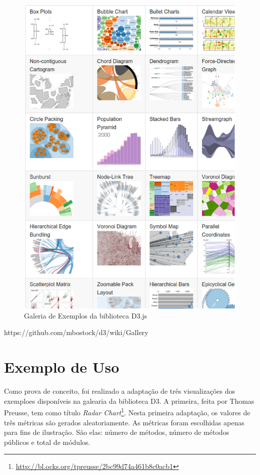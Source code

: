 \begin{figure}[!htb]
	\centering
    \includegraphics[keepaspectratio=true,scale=0.5]
    {figuras/d3_gallery.eps}
  \caption{Galeria de Exemplos da biblioteca D3.js \cite{galleryD3}}
  \label{fig:d3_gallery}
\end{figure}

https://github.com/mbostock/d3/wiki/Gallery

\section{Exemplo de Uso}


Como prova de conceito, foi realizado a adaptação de três visualizações dos exemploes disponíveis na galearia da biblioteca D3. A primeira, feita por Thomas Preusse, tem como título \textit{Radar Chart}\footnote{\url{http://bl.ocks.org/tpreusse/2bc99d74a461b8c0acb1}}. Nesta primeira adaptação, os valores de três métricas são gerados aleatoriamente. As métricas foram escolhidas apenas para fins de ilustração. São elas: número de métodos, número de métodos públicos e total de módulos.

